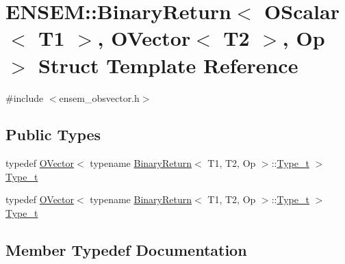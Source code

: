 \hypertarget{structENSEM_1_1BinaryReturn_3_01OScalar_3_01T1_01_4_00_01OVector_3_01T2_01_4_00_01Op_01_4}{}\section{E\+N\+S\+EM\+:\+:Binary\+Return$<$ O\+Scalar$<$ T1 $>$, O\+Vector$<$ T2 $>$, Op $>$ Struct Template Reference}
\label{structENSEM_1_1BinaryReturn_3_01OScalar_3_01T1_01_4_00_01OVector_3_01T2_01_4_00_01Op_01_4}


{\ttfamily \#include $<$ensem\+\_\+obsvector.\+h$>$}

\subsection*{Public Types}
\begin{DoxyCompactItemize}
\item 
typedef \mbox{\hyperlink{classENSEM_1_1OVector}{O\+Vector}}$<$ typename \mbox{\hyperlink{structENSEM_1_1BinaryReturn}{Binary\+Return}}$<$ T1, T2, Op $>$\+::\mbox{\hyperlink{structENSEM_1_1BinaryReturn_3_01OScalar_3_01T1_01_4_00_01OVector_3_01T2_01_4_00_01Op_01_4_ab27873926cc30b187ec230fa31f23dae}{Type\+\_\+t}} $>$ \mbox{\hyperlink{structENSEM_1_1BinaryReturn_3_01OScalar_3_01T1_01_4_00_01OVector_3_01T2_01_4_00_01Op_01_4_ab27873926cc30b187ec230fa31f23dae}{Type\+\_\+t}}
\item 
typedef \mbox{\hyperlink{classENSEM_1_1OVector}{O\+Vector}}$<$ typename \mbox{\hyperlink{structENSEM_1_1BinaryReturn}{Binary\+Return}}$<$ T1, T2, Op $>$\+::\mbox{\hyperlink{structENSEM_1_1BinaryReturn_3_01OScalar_3_01T1_01_4_00_01OVector_3_01T2_01_4_00_01Op_01_4_ab27873926cc30b187ec230fa31f23dae}{Type\+\_\+t}} $>$ \mbox{\hyperlink{structENSEM_1_1BinaryReturn_3_01OScalar_3_01T1_01_4_00_01OVector_3_01T2_01_4_00_01Op_01_4_ab27873926cc30b187ec230fa31f23dae}{Type\+\_\+t}}
\end{DoxyCompactItemize}


\subsection{Member Typedef Documentation}
\mbox{\label{structENSEM_1_1BinaryReturn_3_01OScalar_3_01T1_01_4_00_01OVector_3_01T2_01_4_00_01Op_01_4_ab27873926cc30b187ec230fa31f23dae}} 
